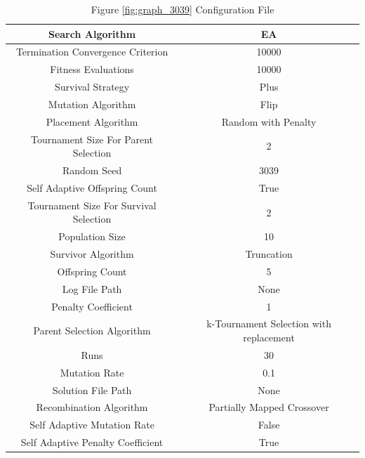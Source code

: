 \documentclass{standalone}
\begin{document}
\begin{table}[!htb]
	\centering
	\caption{Figure \ref{fig:graph_3039} Configuration File}
	\label{tab:graph_3039}
	\begin{tabular}{| c | c |}
		\hline
		Search Algorithm		& EA		 \\
		\hline
		Termination Convergence Criterion		& 10000		 \\
		\hline
		Fitness Evaluations		& 10000		 \\
		\hline
		Survival Strategy		& Plus		 \\
		\hline
		Mutation Algorithm		& Flip		 \\
		\hline
		Placement Algorithm		& Random with Penalty		 \\
		\hline
		Tournament Size For Parent Selection		& 2		 \\
		\hline
		Random Seed		& 3039		 \\
		\hline
		Self Adaptive Offspring Count		& True		 \\
		\hline
		Tournament Size For Survival Selection		& 2		 \\
		\hline
		Population Size		& 10		 \\
		\hline
		Survivor Algorithm		& Truncation		 \\
		\hline
		Offspring Count		& 5		 \\
		\hline
		Log File Path		& None		 \\
		\hline
		Penalty Coefficient		& 1		 \\
		\hline
		Parent Selection Algorithm		& k-Tournament Selection with replacement		 \\
		\hline
		Runs		& 30		 \\
		\hline
		Mutation Rate		& 0.1		 \\
		\hline
		Solution File Path		& None		 \\
		\hline
		Recombination Algorithm		& Partially Mapped Crossover		 \\
		\hline
		Self Adaptive Mutation Rate		& False		 \\
		\hline
		Self Adaptive Penalty Coefficient		& True		 \\
		\hline
	\end{tabular}
\end{table}
\end{document}
